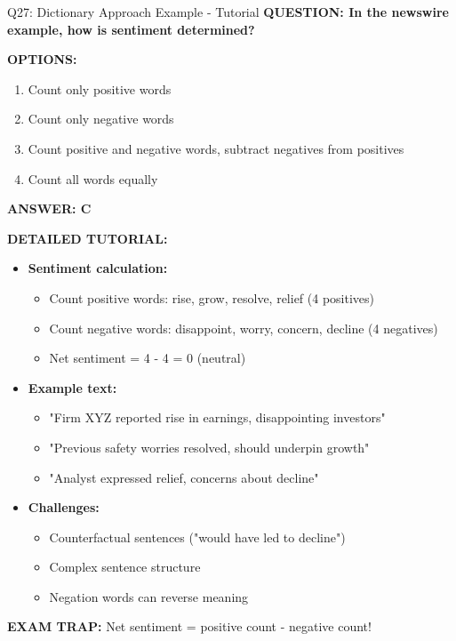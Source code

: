 \documentclass[8pt]{beamer}
\begin{document}
	\begin{frame}{Q27: Dictionary Approach Example - Tutorial}
		\fontsize{6.5}{7.5}\selectfont
		\textbf{QUESTION: In the newswire example, how is sentiment determined?}
		
		\vspace{0.1cm}
		\textbf{OPTIONS:}
		\begin{enumerate}
			\item Count only positive words
			\item Count only negative words
			\item Count positive and negative words, subtract negatives from positives
			\item Count all words equally
		\end{enumerate}
		
		\vspace{0.1cm}
		\textcolor{myblue}{\textbf{ANSWER: C}}
		
		\vspace{0.1cm}
		\textbf{DETAILED TUTORIAL:}
		\begin{itemize}
			\item \textbf{Sentiment calculation:}
			\begin{itemize}
				\item Count positive words: rise, grow, resolve, relief (4 positives)
				\item Count negative words: disappoint, worry, concern, decline (4 negatives)
				\item Net sentiment = 4 - 4 = 0 (neutral)
			\end{itemize}
			\item \textbf{Example text:}
			\begin{itemize}
				\item "Firm XYZ reported rise in earnings, disappointing investors"
				\item "Previous safety worries resolved, should underpin growth"
				\item "Analyst expressed relief, concerns about decline"
			\end{itemize}
			\item \textbf{Challenges:}
			\begin{itemize}
				\item Counterfactual sentences ("would have led to decline")
				\item Complex sentence structure
				\item Negation words can reverse meaning
			\end{itemize}
		\end{itemize}
		
		\textcolor{myred}{\textbf{EXAM TRAP:}} Net sentiment = \textcolor{myblue}{positive count - negative count}!
	\end{frame}
	
\end{document}
